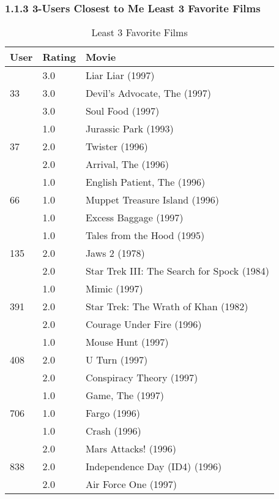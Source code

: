 \subsubsection{1.1.3 3-Users Closest to Me Least 3 Favorite Films}
\begin{table}[h!]
\centering
\begin{tabular}{| l | l | l |}
\hline
User & Rating & Movie \\
\hline
\multirow{3}{*}{33}
& 3.0 & Liar Liar (1997) \\
& 3.0 & Devil's Advocate, The (1997) \\ 
 & 3.0 & Soul Food (1997)  \\ \hline
\multirow{3}{*}{37}
& 1.0 & Jurassic Park (1993)\\ 
& 2.0 & Twister (1996)  \\ 
& 2.0 & Arrival, The (1996) \\ \hline
\multirow{3}{*}{66}
& 1.0 & English Patient, The (1996) \\ 
& 1.0 & Muppet Treasure Island (1996) \\ 
& 1.0 & Excess Baggage (1997)\\ \hline
\multirow{3}{*}{135}
& 1.0 & Tales from the Hood (1995)\\ 
 & 2.0 & Jaws 2 (1978)  \\ 
 & 2.0 & Star Trek III: The Search for Spock (1984)\\ \hline
\multirow{3}{*}{391}
& 1.0 & Mimic (1997)  \\ 
 & 2.0 & Star Trek: The Wrath of Khan (1982) \\ 
 & 2.0 & Courage Under Fire (1996)\\ \hline
\multirow{3}{*}{408}
& 1.0 & Mouse Hunt (1997)  \\ 
 & 2.0 & U Turn (1997) \\ 
 & 2.0 & Conspiracy Theory (1997)\\ \hline 
\multirow{3}{*}{706}
& 1.0 & Game, The (1997) \\ 
 & 1.0 & Fargo (1996) \\ 
 & 1.0 & Crash (1996) \\ \hline 
\multirow{3}{*}{838}
& 2.0 & Mars Attacks! (1996) \\ 
 & 2.0 & Independence Day (ID4) (1996) \\ 
 & 2.0 & Air Force One (1997)\\ \hline
\end{tabular}
\caption{Least 3 Favorite Films}
\label{tab:bottomfavorite}
\end{table}

